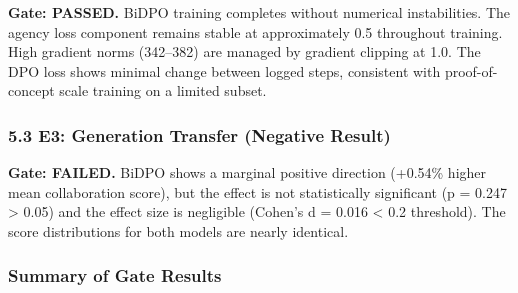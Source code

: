 \textbf{Gate: PASSED.} BiDPO training completes without numerical instabilities. The agency loss component remains stable at approximately 0.5 throughout training. High gradient norms (342--382) are managed by gradient clipping at 1.0. The DPO loss shows minimal change between logged steps, consistent with proof-of-concept scale training on a limited subset.

\subsubsection{5.3 E3: Generation Transfer (Negative Result)}

\begin{table}[htbp]
\centering
{}
\end{table}

\begin{table}[htbp]
\centering
{}
\end{table}

\textbf{Gate: FAILED.} BiDPO shows a marginal positive direction (+0.54\% higher mean collaboration score), but the effect is not statistically significant (p = 0.247 > 0.05) and the effect size is negligible (Cohen's d = 0.016 < 0.2 threshold). The score distributions for both models are nearly identical.

\subsubsection{Summary of Gate Results}

\begin{table}[htbp]
\centering
{}
\end{table}


